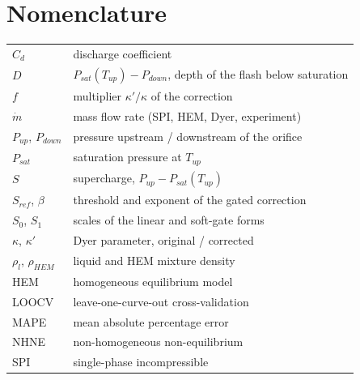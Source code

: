 \documentclass[11pt,a4paper]{article}
\newcommand{\mdot}{\dot m}
\begin{document}
\section*{Nomenclature}
{\small
\begin{tabular}{@{}p{2.8cm}p{11cm}@{}}
$C_d$ & discharge coefficient\\
$D$ & $P_{sat}(T_{up})-P_{down}$, depth of the flash below saturation\\
$f$ & multiplier $\kappa'/\kappa$ of the correction\\
$\mdot$ & mass flow rate (SPI, HEM, Dyer, experiment)\\
$P_{up}$, $P_{down}$ & pressure upstream / downstream of the orifice\\
$P_{sat}$ & saturation pressure at $T_{up}$\\
$S$ & supercharge, $P_{up}-P_{sat}(T_{up})$\\
$S_{ref}$, $\beta$ & threshold and exponent of the gated correction\\
$S_0$, $S_1$ & scales of the linear and soft-gate forms\\
$\kappa$, $\kappa'$ & Dyer parameter, original / corrected\\
$\rho_l$, $\rho_{HEM}$ & liquid and HEM mixture density\\[3pt]
HEM & homogeneous equilibrium model\\
LOOCV & leave-one-curve-out cross-validation\\
MAPE & mean absolute percentage error\\
NHNE & non-homogeneous non-equilibrium\\
SPI & single-phase incompressible\\
\end{tabular}}

\end{document}
